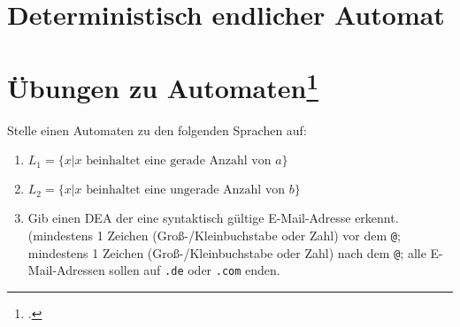 \documentclass{lehramt-informatik-aufgabe}
\begin{document}
\section{Deterministisch endlicher Automat
}

\section{Übungen zu Automaten\footcite[Seite 28]{theo:fs:1}}

Stelle einen Automaten zu den folgenden Sprachen auf:

\begin{enumerate}

%

\item $L_1 = \{ x | x \text{ beinhaltet eine gerade Anzahl von } a \}$

\begin{liAntwort}
\begin{center}
\end{center}
\end{liAntwort}

%

\item $L_2 = \{ x | x \text{ beinhaltet eine ungerade Anzahl von } b \}$

\begin{liAntwort}
\begin{center}
\end{center}
\end{liAntwort}

%

\item Gib einen DEA der eine syntaktisch gültige E-Mail-Adresse erkennt.
(mindestens 1 Zeichen (Groß-/Kleinbuchstabe oder Zahl) vor dem
\texttt{@}; mindestens 1 Zeichen (Groß-/Kleinbuchstabe oder Zahl) nach
dem \texttt{@}; alle E-Mail-Adressen sollen auf \texttt{.de} oder
\texttt{.com} enden.

\end{enumerate}
\end{document}
